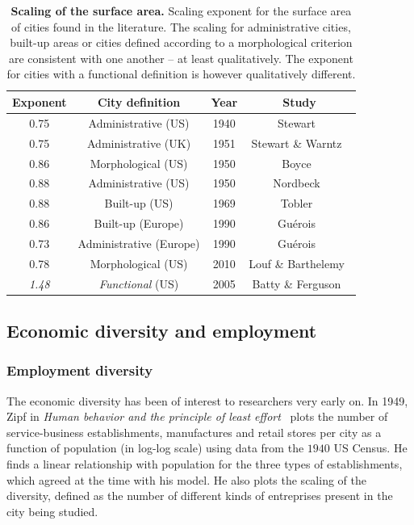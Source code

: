 \begin{table}[!h]
    \centering
\begin{tabular}{|cccc|}
\hline
Exponent & City definition & Year & Study\\
\hline
0.75 & Administrative (US) & 1940 & Stewart~\cite{Stewart:1947}\\
0.75 & Administrative (UK) & 1951 & Stewart \& Warntz~\cite{Stewart:1958}\\
0.86 & Morphological (US) & 1950 & Boyce~\cite{Boyce:1963}\\
0.88 & Administrative (US) & 1950 & Nordbeck~\cite{Nordbeck:1965}\\
0.88 & Built-up (US) & 1969 & Tobler~\cite{Tobler:1969}\\
0.86 & Built-up (Europe) & 1990 & Gu\'erois~\cite{Guerois:2003}\\
0.73 & Administrative (Europe) & 1990 & Gu\'erois~\cite{Guerois:2003}\\
0.78 & Morphological (US) & 2010 & Louf \& Barthelemy~\cite{Louf:2014_scaling}\\
\hline
\emph{1.48} & \emph{Functional} (US) & 2005 & Batty \& Ferguson~\cite{Batty:2011}\\
\hline
\end{tabular}
\caption{{\bf Scaling of the surface area.} Scaling exponent for the surface area of
cities found in the literature. The scaling for administrative cities, built-up
areas or cities defined according to a morphological criterion are consistent
with one another -- at least qualitatively. The exponent for cities with a
functional definition is however qualitatively different.}
\label{table:area}
\end{table}

\subsection{Economic diversity and employment}
\label{sub:economic_diversity}

\subsubsection{Employment diversity}
\label{ssub:employment_diversity}

The economic diversity has been of interest to researchers very early on. In
1949, Zipf in \emph{Human behavior and the principle of least
effort}~\cite{Zipf:1949} plots the number of service-business establishments, manufactures and
retail stores per city as a function of population (in log-log scale) using data
from the $1940$ US Census. He finds a linear relationship with population for
the three types of establishments, which agreed at the time with his model. He
also plots the scaling of the diversity, defined as the number of different kinds of
entreprises present in the city being studied. 

